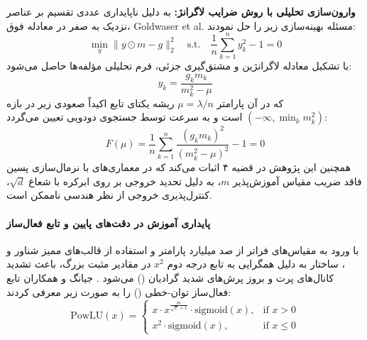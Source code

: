 \textbf{وارون‌سازی تحلیلی  با روش ضرایب لاگرانژ:}
به دلیل ناپایداری عددی تقسیم بر عناصر نزدیک به صفر در معادله فوق، Goldwaser et al. \cite{goldwaser2026equivalence} مسئله بهینه‌سازی زیر را حل نمودند:
\begin{equation}
    \min_y \|y \odot m - g\|_2^2 \quad \text{s.t.} \quad \frac{1}{n} \sum_{k=1}^n y_k^2 - 1 = 0
\end{equation}
با تشکیل معادله لاگرانژین و مشتق‌گیری جزئی، فرم تحلیلی مؤلفه‌ها حاصل می‌شود:
\begin{equation}
    y_k = \frac{g_k m_k}{m_k^2 - \mu}
\end{equation}
که در آن پارامتر $\mu = \lambda/n$ ریشه یکتای تابع اکیداً صعودی زیر در بازه $(-\infty, \min_k m_k^2)$ است و به سرعت توسط جستجوی دودویی تعیین می‌گردد:
\begin{equation}
    F(\mu) = \frac{1}{n} \sum_{k=1}^n \frac{(g_k m_k)^2}{(m_k^2 - \mu)^2} - 1 = 0
\end{equation}
همچنین این پژوهش در قضیه ۴ اثبات می‌کند که در معماری‌های با نرمال‌سازی پسین فاقد ضریب مقیاس آموزش‌پذیر $m$، به دلیل تحدید خروجی بر روی ابرکره با شعاع $\sqrt{d}$، کنترل‌پذیری خروجی از نظر هندسی ناممکن است.

\paragraph*{پایداری آموزش در دقت‌های پایین و تابع فعال‌ساز }
با ورود به مقیاس‌های فراتر از صد میلیارد پارامتر و استفاده از قالب‌های ممیز شناور  و ، ساختار  به دلیل همگرایی به تابع درجه دوم $x^2$ در مقادیر مثبت بزرگ، باعث تشدید کانال‌های پرت و بروز پرش‌های شدید گرادیان () می‌شود \cite{jiang2026powlu}.
جیانگ و همکاران \cite{jiang2026powlu} تابع فعال‌ساز توان-خطی () را به صورت زیر معرفی کردند:
\begin{equation}
    \text{PowLU}(x) = \begin{cases} 
        x \cdot x^{\frac{m}{\sqrt{x}+1}} \cdot \text{sigmoid}(x), & \text{if } x > 0 \\ 
        x^2 \cdot \text{sigmoid}(x), & \text{if } x \le 0 
    \end{cases}
\end{equation}

